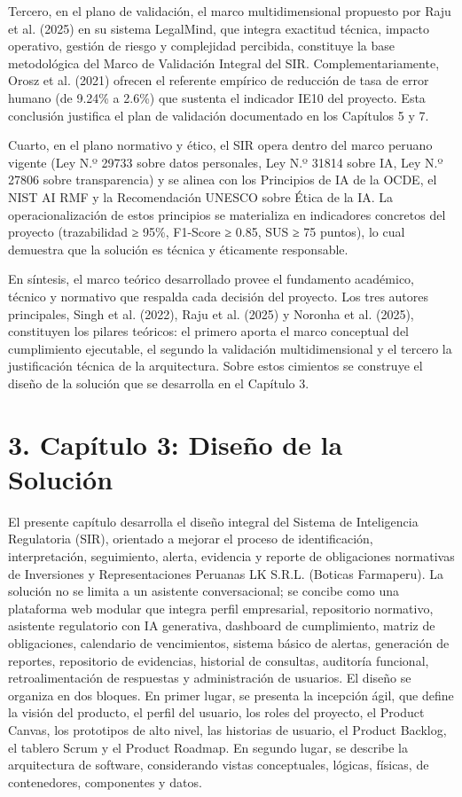\documentclass[12pt,a4paper,oneside]{report}
\begin{document}
Tercero, en el plano de validación, el marco multidimensional propuesto
por Raju et al. (2025) en su sistema LegalMind, que integra exactitud
técnica, impacto operativo, gestión de riesgo y complejidad percibida,
constituye la base metodológica del Marco de Validación Integral del
SIR. Complementariamente, Orosz et al. (2021) ofrecen el referente
empírico de reducción de tasa de error humano (de 9.24\% a 2.6\%) que
sustenta el indicador IE10 del proyecto. Esta conclusión justifica el
plan de validación documentado en los Capítulos 5 y 7.

Cuarto, en el plano normativo y ético, el SIR opera dentro del marco
peruano vigente (Ley N.º 29733 sobre datos personales, Ley N.º 31814
sobre IA, Ley N.º 27806 sobre transparencia) y se alinea con los
Principios de IA de la OCDE, el NIST AI RMF y la Recomendación UNESCO
sobre Ética de la IA. La operacionalización de estos principios se
materializa en indicadores concretos del proyecto (trazabilidad ≥ 95\%,
F1-Score ≥ 0.85, SUS ≥ 75 puntos), lo cual demuestra que la solución es
técnica y éticamente responsable.

En síntesis, el marco teórico desarrollado provee el fundamento
académico, técnico y normativo que respalda cada decisión del proyecto.
Los tres autores principales, Singh et al. (2022), Raju et al. (2025) y
Noronha et al. (2025), constituyen los pilares teóricos: el primero
aporta el marco conceptual del cumplimiento ejecutable, el segundo la
validación multidimensional y el tercero la justificación técnica de la
arquitectura. Sobre estos cimientos se construye el diseño de la
solución que se desarrolla en el Capítulo 3.

\section{3. Capítulo 3: Diseño de la
Solución}\label{capuxedtulo-3-diseuxf1o-de-la-soluciuxf3n}

El presente capítulo desarrolla el diseño integral del Sistema de
Inteligencia Regulatoria (SIR), orientado a mejorar el proceso de
identificación, interpretación, seguimiento, alerta, evidencia y reporte
de obligaciones normativas de Inversiones y Representaciones Peruanas LK
S.R.L. (Boticas Farmaperu). La solución no se limita a un asistente
conversacional; se concibe como una plataforma web modular que integra
perfil empresarial, repositorio normativo, asistente regulatorio con IA
generativa, dashboard de cumplimiento, matriz de obligaciones,
calendario de vencimientos, sistema básico de alertas, generación de
reportes, repositorio de evidencias, historial de consultas, auditoría
funcional, retroalimentación de respuestas y administración de usuarios.
El diseño se organiza en dos bloques. En primer lugar, se presenta la
incepción ágil, que define la visión del producto, el perfil del
usuario, los roles del proyecto, el Product Canvas, los prototipos de
alto nivel, las historias de usuario, el Product Backlog, el tablero
Scrum y el Product Roadmap. En segundo lugar, se describe la
arquitectura de software, considerando vistas conceptuales, lógicas,
físicas, de contenedores, componentes y datos.
\end{document}
